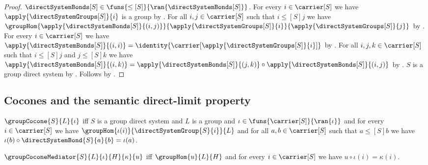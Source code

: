 \begin{proof}
    $\directSystemBonds[S]\in
        \funs{\leq[S]}{\ran{\directSystemBonds[S]}}$.
    For every $i\in\carrier[S]$ we have
        $\apply{\directSystemGroups[S]}{i}$ is a group by \auto.
    For all $i,j\in\carrier[S]$ such that
        $i\mathrel{\leq[S]}j$ we have
        $\groupHom
            {\apply{\directSystemBonds[S]}{(i,j)}}
            {\apply{\directSystemGroups[S]}{i}}
            {\apply{\directSystemGroups[S]}{j}}$ by \auto.
    For every $i\in\carrier[S]$ we have
        $\apply{\directSystemBonds[S]}{(i,i)}
            =\identity{\carrier[\apply{\directSystemGroups[S]}{i}]}$ by
        \auto.
    For all $i,j,k\in\carrier[S]$ such that
        $i\mathrel{\leq[S]}j$ and $j\mathrel{\leq[S]}k$ we have
        $\apply{\directSystemBonds[S]}{(i,k)}
            =\apply{\directSystemBonds[S]}{(j,k)}\circ
                \apply{\directSystemBonds[S]}{(i,j)}$ by \auto.
    $S$ is a group direct system by .
    Follows by .
\end{proof}

\subsection{Cocones and the semantic direct-limit property}

\begin{definition}\label{group_cocone}
    $\groupCocone{S}{L}{\iota}$ iff
        $S$ is a group direct system and $L$ is a group and
        $\iota\in\funs{\carrier[S]}{\ran{\iota}}$ and
        for every $i\in\carrier[S]$ we have
            $\groupHom{\iota(i)}{\directSystemGroup{S}{i}}{L}$ and
        for all $a,b\in\carrier[S]$ such that
            $a\mathrel{\leq[S]}b$ we have
            $\iota(b)\circ\directSystemBond{S}{a}{b}=\iota(a)$.
\end{definition}

\begin{definition}\label{group_cocone_mediator}
    $\groupCoconeMediator{S}{L}{\iota}{H}{\kappa}{u}$ iff
        $\groupHom{u}{L}{H}$ and
        for every $i\in\carrier[S]$ we have
            $u\circ\iota(i)=\kappa(i)$.
\end{definition}


